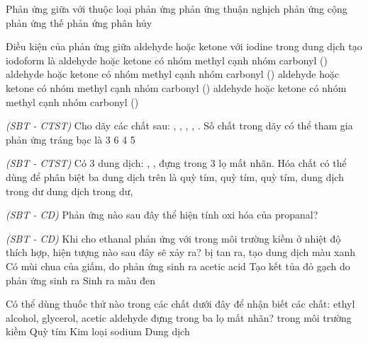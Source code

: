 \documentclass[12pt,a4paper]{article}
\begin{document}
\begin{ex}
Phản ứng giữa  với  thuộc loại phản ứng
\choice
{phản ứng thuận nghịch}
{phản ứng cộng}
{phản ứng thế}
{phản ứng phân hủy}
\end{ex}

\begin{ex}
Điều kiện của phản ứng giữa aldehyde hoặc ketone với iodine trong dung dịch  tạo iodoform là
\choice
{aldehyde hoặc ketone có nhóm methyl cạnh nhóm carbonyl ()}
{aldehyde hoặc ketone có nhóm methyl cạnh nhóm carbonyl ()}
{aldehyde hoặc ketone có nhóm methyl cạnh nhóm carbonyl ()}
{aldehyde hoặc ketone có nhóm methyl cạnh nhóm carbonyl ()}
\end{ex}

\begin{ex}
\textit{(SBT - CTST)} Cho dãy các chất sau: , , , , . Số chất trong dãy có thể tham gia phản ứng tráng bạc là
\choice
{3}
{6}
{4}
{5}
\end{ex}

\begin{ex}
\textit{(SBT - CTST)} Có 3 dung dịch: , ,  đựng trong 3 lọ mất nhãn. Hóa chất có thể dùng để phân biệt ba dung dịch trên là
\choice
{quỳ tím, }
{quỳ tím, }
{quỳ tím, dung dịch  trong  dư}
{dung dịch  trong  dư, }
\end{ex}

\begin{ex}
\textit{(SBT - CD)} Phản ứng nào sau đây thể hiện tính oxi hóa của propanal?
\choice
{}
{}
{}
{}
\end{ex}

\begin{ex}
\textit{(SBT - CD)} Khi cho ethanal phản ứng với  trong môi trường kiềm ở nhiệt độ thích hợp, hiện tượng nào sau đây sẽ xảy ra?
\choice
{ bị tan ra, tạo dung dịch màu xanh}
{Có mùi chua của giấm, do phản ứng sinh ra acetic acid}
{Tạo kết tủa đỏ gạch do phản ứng sinh ra }
{Sinh ra  màu đen}
\end{ex}

\begin{ex}
Có thể dùng thuốc thử nào trong các chất dưới đây để nhận biết các chất: ethyl alcohol, glycerol, acetic aldehyde đựng trong ba lọ mất nhãn?
\choice
{ trong môi trường kiềm}
{Quỳ tím}
{Kim loại sodium}
{Dung dịch }
\end{ex}
\end{document}
